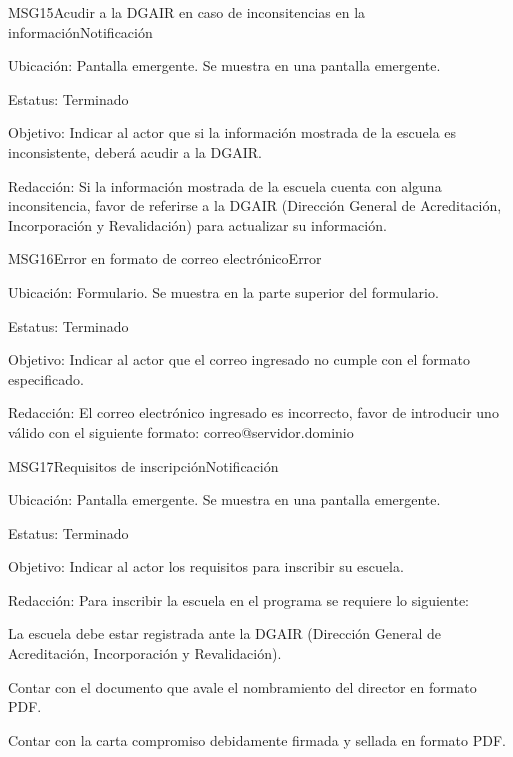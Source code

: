 
\begin{mensaje}{MSG15}{Acudir a la DGAIR en caso de inconsitencias en la información}{Notificación}
	\item[Ubicación:] Pantalla emergente. Se muestra en una pantalla emergente.
	\item[Estatus:] Terminado
	\item[Objetivo:] Indicar al actor que si la información mostrada de la escuela es inconsistente, deberá acudir a la DGAIR.
	\item[Redacción:] Si la información mostrada de la escuela cuenta con alguna inconsitencia, favor de referirse a la DGAIR 
	      (Dirección General de Acreditación, Incorporación y Revalidación) para actualizar su información.
\end{mensaje}

\begin{mensaje}{MSG16}{Error en formato de correo electrónico}{Error}
	\item[Ubicación:] Formulario. Se muestra en la parte superior del formulario.
	\item[Estatus:] Terminado
	\item[Objetivo:] Indicar al actor que el correo ingresado no cumple con el formato especificado.
	\item[Redacción:] El correo electrónico ingresado es incorrecto, favor de introducir uno válido con el siguiente formato: correo@servidor.dominio
\end{mensaje}

\begin{mensaje}{MSG17}{Requisitos de inscripción}{Notificación}
	\item[Ubicación:] Pantalla emergente. Se muestra en una pantalla emergente.
	\item[Estatus:] Terminado
	\item[Objetivo:] Indicar al actor los requisitos para inscribir su escuela.
	\item[Redacción:] Para inscribir la escuela en el programa se requiere lo siguiente:
	\begin{Citemize}
		\item La escuela debe estar registrada ante la DGAIR (Dirección General de Acreditación,
		      Incorporación y Revalidación).
		\item Contar con el documento que avale el nombramiento del director en formato PDF.
		\item Contar con la carta compromiso debidamente firmada y sellada en formato PDF.
	\end{Citemize}
 \end{mensaje}
 
